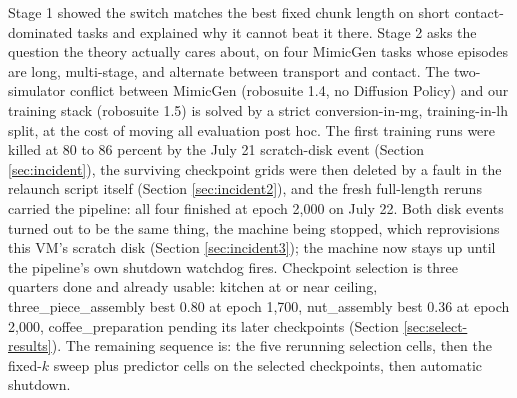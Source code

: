 \documentclass[11pt]{article}
\begin{document}
Stage 1 showed the switch matches the best fixed chunk length on short
contact-dominated tasks and explained why it cannot beat it there. Stage 2 asks
the question the theory actually cares about, on four MimicGen tasks whose
episodes are long, multi-stage, and alternate between transport and contact.
The two-simulator conflict between MimicGen (robosuite 1.4, no Diffusion
Policy) and our training stack (robosuite 1.5) is solved by a strict
conversion-in-mg, training-in-lh split, at the cost of moving all evaluation
post hoc. The first training runs were killed at 80 to 86 percent by the
July 21 scratch-disk event (Section \ref{sec:incident}), the surviving
checkpoint grids were then deleted by a fault in the relaunch script itself
(Section \ref{sec:incident2}), and the fresh full-length reruns carried the
pipeline: all four finished at epoch 2,000 on July 22. Both disk events
turned out to be the same thing, the machine being stopped, which
reprovisions this VM's scratch disk (Section \ref{sec:incident3}); the
machine now stays up until the pipeline's own shutdown watchdog fires.
Checkpoint selection is three quarters done and already usable: kitchen at
or near ceiling, three\_piece\_assembly best 0.80 at epoch 1,700,
nut\_assembly best 0.36 at epoch 2,000, coffee\_preparation pending its
later checkpoints (Section \ref{sec:select-results}). The remaining
sequence is: the five rerunning selection cells, then the fixed-$k$ sweep
plus predictor cells on the selected checkpoints, then automatic shutdown.
\end{document}
